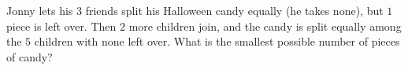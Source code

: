 Jonny lets his $3$ friends split his Halloween candy equally (he takes none), but $1$ piece is left over. Then $2$ more children join, and the candy is split equally among the $5$ children with none left over. What is the smallest possible number of pieces of candy?
